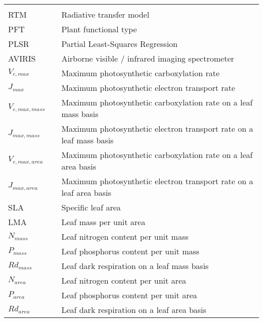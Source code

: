 \begin{center}
  \begin{tabular}{lll}
    \hspace*{2em} & \hspace*{1in} & \hspace*{4.5in} \\
    RTM & \dotfill & Radiative transfer model \\
    PFT & \dotfill & Plant functional type \\
    PLSR & \dotfill & Partial Least-Squares Regression \\
    AVIRIS & \dotfill & Airborne visible / infrared imaging spectrometer \\
    $V_{c,max}$ & \dotfill & Maximum photosynthetic carboxylation rate \\
    $J_{max}$ & \dotfill & Maximum photosynthetic electron transport rate \\
    $V_{c,max,mass}$ & \dotfill & Maximum photosynthetic carboxylation rate on a leaf mass basis \\
    $J_{max,mass}$ & \dotfill & Maximum photosynthetic electron transport rate on a leaf mass basis \\
    $V_{c,max,area}$ & \dotfill & Maximum photosynthetic carboxylation rate on a leaf area basis \\
    $J_{max,area}$ & \dotfill & Maximum photosynthetic electron transport rate on a leaf area basis \\
    SLA & \dotfill & Specific leaf area \\
    LMA & \dotfill & Leaf mass per unit area \\
    $N_{mass}$ & \dotfill & Leaf nitrogen content per unit mass \\
    $P_{mass}$ & \dotfill & Leaf phosphorus content per unit mass \\
    $Rd_{mass}$ & \dotfill & Leaf dark respiration on a leaf mass basis \\
    $N_{area}$ & \dotfill & Leaf nitrogen content per unit area \\
    $P_{area}$ & \dotfill & Leaf phosphorus content per unit area \\
    $Rd_{area}$ & \dotfill & Leaf dark respiration on a leaf area basis \\
  \end{tabular}
\end{center}
\cleardoublepage


\newpage
\endofprelim
